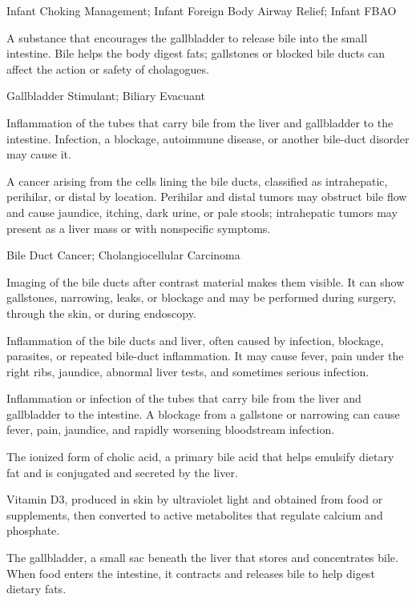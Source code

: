 \synonyms
Infant Choking Management; Infant Foreign Body Airway Relief; Infant FBAO

 A substance that encourages the gallbladder to release bile into the small intestine. Bile helps the body digest fats; gallstones or blocked bile ducts can affect the action or safety of cholagogues.

\synonyms
Gallbladder Stimulant; Biliary Evacuant

 Inflammation of the tubes that carry bile from the liver and gallbladder to the intestine. Infection, a blockage, autoimmune disease, or another bile-duct disorder may cause it.

 A cancer arising from the cells lining the bile ducts, classified as intrahepatic, perihilar, or distal by location. Perihilar and distal tumors may obstruct bile flow and cause jaundice, itching, dark urine, or pale stools; intrahepatic tumors may present as a liver mass or with nonspecific symptoms.

\synonyms
Bile Duct Cancer; Cholangiocellular Carcinoma

 Imaging of the bile ducts after contrast material makes them visible. It can show gallstones, narrowing, leaks, or blockage and may be performed during surgery, through the skin, or during endoscopy.

 Inflammation of the bile ducts and liver, often caused by infection, blockage, parasites, or repeated bile-duct inflammation. It may cause fever, pain under the right ribs, jaundice, abnormal liver tests, and sometimes serious infection.

 Inflammation or infection of the tubes that carry bile from the liver and gallbladder to the intestine. A blockage from a gallstone or narrowing can cause fever, pain, jaundice, and rapidly worsening bloodstream infection.

 The ionized form of cholic acid, a primary bile acid that helps emulsify dietary fat and is conjugated and secreted by the liver.

 Vitamin D3, produced in skin by ultraviolet light and obtained from food or supplements, then converted to active metabolites that regulate calcium and phosphate.

 The gallbladder, a small sac beneath the liver that stores and concentrates bile. When food enters the intestine, it contracts and releases bile to help digest dietary fats.

